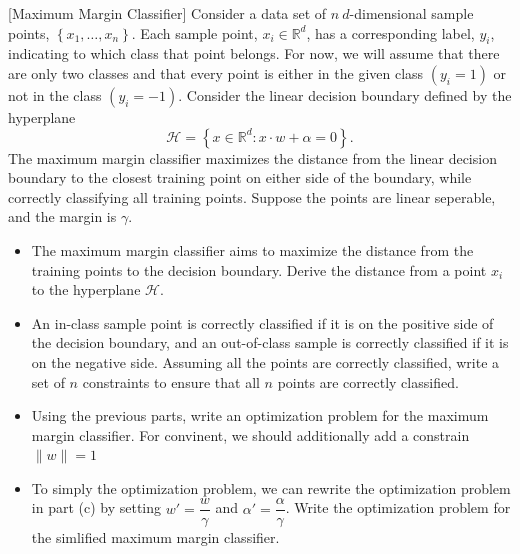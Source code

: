 \item {} [Maximum Margin Classifier]
Consider a data set of $n\ d$-dimensional sample points, $\left\{x_1, \ldots, x_n\right\}$. Each sample point, $x_i \in \mathbb{R}^d$, has a corresponding label, $y_i$, indicating to which class that point belongs. For now, we will assume that there are only two classes and that every point is either in the given class $\left(y_i=1\right)$ or not in the class $\left(y_i=-1\right)$. Consider the linear decision boundary defined by the hyperplane
$$
\mathcal{H}=\left\{x \in \mathbb{R}^d: x \cdot w+\alpha=0\right\} .
$$
The maximum margin classifier maximizes the distance from the linear decision boundary to the closest training point on either side of the boundary, while correctly classifying all training points. Suppose the points are linear seperable, and the margin is $\gamma$.

\begin{itemize}
\item[(a)]The maximum margin classifier aims to maximize the distance from the training points to the decision boundary. Derive the distance from a point $x_i$ to the hyperplane $\mathcal{H}$. ~

\item[(b)] An in-class sample point is correctly classified if it is on the positive side of the decision boundary, and an out-of-class sample is correctly classified if it is on the negative side. Assuming all the points are correctly classified, write a set of $n$ constraints to ensure that all $n$ points are correctly classified. ~

\item[(c)] Using the previous parts, write an optimization problem for the maximum margin classifier. For convinent, we should additionally add a constrain $\|w\|=1$ ~

\item[(d)] To simply the optimization problem, we can rewrite the optimization problem in part (c) by setting $w'=\dfrac{w}{\gamma}$ and $\alpha'=\dfrac{\alpha}{\gamma}$. Write the optimization problem for the simlified maximum margin classifier. ~

\end{itemize}

\solution

